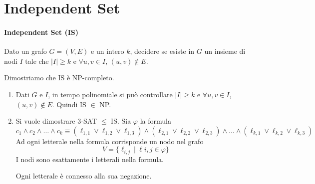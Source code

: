\section{Independent Set}
\paragraph{Independent Set (IS)} Dato un grafo $G=(V,E)$ e un intero $k$, decidere se esiste  in $G$ un insieme di nodi $I$ tale che $|I|\geq k$ e $\forall u,v\in I$, $(u,v)\notin E$.\medskip

Dimostriamo che IS è NP-completo.
\begin{enumerate}
    \item Dati $G$ e $I$, in tempo polinomiale si può controllare $|I|\geq k$ e $\forall u,v\in I$, $(u,v)\notin E$. Quindi IS $\in$ NP.
    \item Si vuole dimostrare 3-SAT $\leq$ IS. Sia $\varphi$ la formula
    $$
        c_1\land c_2\land\dots\land c_k \equiv
        (\ell_{1,1}\lor\ell_{1,2}\lor\ell_{1,3}) \land
        (\ell_{2,1}\lor\ell_{2,2}\lor\ell_{2,3}) \land
        \dots \land
        (\ell_{k,1}\lor\ell_{k,2}\lor\ell_{k,3})
    $$
    Ad ogni letterale nella formula corrisponde un nodo nel grafo
    $$
        V = \{ \ell_{i,j} ~|~ \ell{i,j}\in\varphi \}
    $$
    I nodi sono esattamente i letterali nella formula.
    \begin{center}
    \end{center}
    Ogni letterale è connesso alla sua negazione.
    \begin{center}
\end{center}
\end{enumerate}
